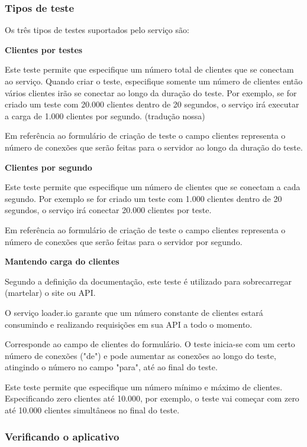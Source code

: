 \subsubsection{Tipos de teste}
  
  Os três tipos de testes suportados pelo serviço são:
  
  \textbf{Clientes por testes}
  
  Este teste permite que especifique um número total de clientes que se conectam ao serviço. Quando criar o teste,
  especifique somente um número de clientes então vários clientes irão se conectar ao longo da duração do teste. 
  Por exemplo, se for criado um teste com 20.000 clientes dentro de 20 segundos, o serviço irá executar a carga de 
  1.000 clientes por segundo. (tradução nossa)
  
  Em referência ao formulário de criação de teste o campo clientes representa o número de conexões que serão
  feitas para o servidor ao longo da duração do teste.
  
  \textbf{Clientes por segundo}
  
  Este teste permite que especifique um número de clientes que se conectam a cada segundo. Por exemplo se for criado
  um teste com 1.000 clientes dentro de 20 segundos, o serviço irá conectar 20.000 clientes por teste.
  
  Em referência ao formulário de criação de teste o campo clientes representa o número de conexões que serão
  feitas para o servidor por segundo.
  
  \textbf{Mantendo carga do clientes}
  
  Segundo a definição da documentação, este teste é utilizado para sobrecarregar (martelar) o site ou \ac{API}.
  
  O serviço loader.io garante que um número constante de clientes estará consumindo e realizando requisições em 
  sua \ac{API} a todo o momento.
  
  Corresponde ao campo de clientes do formulário. O teste inicia-se com um certo número de conexões ("de") 
  e pode aumentar as conexões ao longo do teste, atingindo o número no campo "para", até ao final do teste. 
  
  Este teste permite que especifique um número mínimo e máximo de clientes. Especificando zero clientes
  até 10.000, por exemplo, o teste vai começar com zero até 10.000 clientes simultâneos no final do teste.
  
\subsubsection{Verificando o aplicativo}

